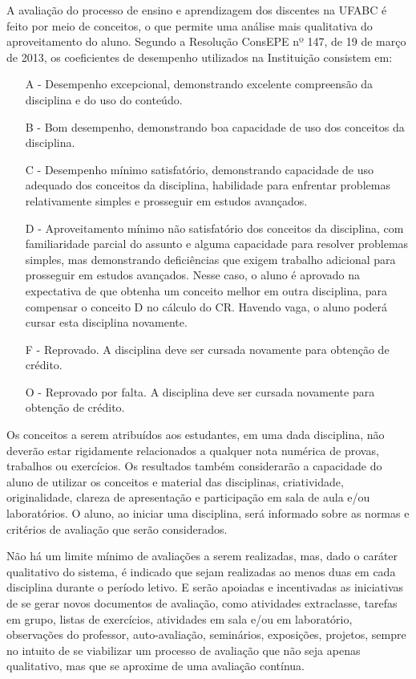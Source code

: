\documentclass{article}
\begin{document}
A avaliação do processo de ensino e aprendizagem dos discentes na UFABC é feito por
meio de conceitos, o que permite uma análise mais qualitativa do aproveitamento do aluno.
Segundo a Resolução ConsEPE nº 147, de 19 de março de 2013, os coeficientes de
desempenho utilizados na Instituição consistem em:
\begin{itemize}
	\item [A -] Desempenho excepcional, demonstrando excelente compreensão da disciplina e do uso do conteúdo.
	\item [B -] Bom desempenho, demonstrando boa capacidade de uso dos conceitos da disciplina.
	\item [C -] Desempenho mínimo satisfatório, demonstrando capacidade de uso adequado dos conceitos da disciplina, habilidade para enfrentar problemas relativamente simples e prosseguir em estudos avançados.
	\item[D -] Aproveitamento mínimo não satisfatório dos conceitos da disciplina, com familiaridade parcial do assunto e alguma capacidade para resolver problemas simples, mas demonstrando deficiências que exigem trabalho adicional para prosseguir em estudos avançados. Nesse caso, o aluno é aprovado na expectativa de que obtenha um conceito melhor em outra disciplina, para compensar o conceito D no cálculo do CR. Havendo vaga, o aluno poderá cursar esta disciplina novamente.
	\item [F -] Reprovado. A disciplina deve ser cursada novamente para obtenção de crédito.
	\item [O -] Reprovado por falta. A disciplina deve ser cursada novamente para obtenção de crédito.
\end{itemize}

Os conceitos a serem atribuídos aos estudantes, em uma dada disciplina, não deverão
estar rigidamente relacionados a qualquer nota numérica de provas, trabalhos ou exercícios. Os resultados também considerarão a capacidade do aluno de utilizar os conceitos e material das disciplinas, criatividade, originalidade, clareza de apresentação e participação em sala de aula e/ou laboratórios. O aluno, ao iniciar uma disciplina, será informado sobre as normas e critérios de avaliação que serão considerados.


Não há um limite mínimo de avaliações a serem realizadas, mas, dado o caráter qualitativo
do sistema, é indicado que sejam realizadas ao menos duas em cada disciplina durante o
período letivo. E serão apoiadas e incentivadas as iniciativas de se gerar novos documentos de avaliação, como atividades extraclasse, tarefas em grupo, listas de exercícios, atividades em sala e/ou em laboratório, observações do professor, auto-avaliação, seminários, exposições, projetos, sempre no intuito de se viabilizar um processo de avaliação que não seja apenas qualitativo, mas que se aproxime de uma avaliação contínua.
\end{document}
